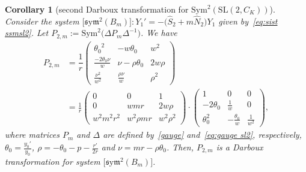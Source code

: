 \documentclass[10pt,a4paper]{amsart}
\numberwithin{equation}{section}
\newtheorem{Corollary}[Theorem]{Corollary}
\def\Sym{\mathrm{Sym}}
\def\sym{\mathfrak{s}\mathrm{y}\mathfrak{m}}
\begin{document}
\begin{Corollary}[second Darboux transformation for $\Sym^2 (\mathrm{SL}(2,C_K))$] \label{thnudarsl22} Consider the system $\big[\sym^2 (B_m)\big]\colon Y_1'=-\big(\widehat{S}_2 + m \widehat{N}_2\big) Y_1$ given by~\eqref{eq:sist ssmsl2}.
Let $P_{2,m} :=\Sym^2 \big(\Delta P_m \Delta^{-1}\big)$. We have
\begin{align}
 P_{2,m} &= \dfrac{1}{r} \begin{pmatrix} {\theta_0}^{2}&-w \theta_0&{w}^{2}
\\ \frac{-2 \theta_0 \nu }{w}&\nu- \rho \theta_0&2 w \rho
\\ \frac {\nu^{2}}{{w}^{2}}&{\frac {\rho \nu }{w}}&{\rho}^{2}\end{pmatrix}\nonumber
\\
&= \frac1{r}\begin{pmatrix}
0&0&1\\ 0&wmr&2 w\rho
\\ {w}^{2}{m}^{2}{r}^{2}&{w}^{2}\rho mr&{w}^{2}{
\rho}^{2}
\end{pmatrix}
\cdot
\begin{pmatrix}
1&0&0\\ -2 \theta_{{0}}
&\frac1{w}&0\\ \theta_{{0}}^{2}&-{\frac{\theta_{0}}{w}}& 	\frac1{w^2}
\end{pmatrix}\!,\label{eq:DT sl22}
\end{align}
where matrices $P_m$ and $\Delta$ are defined by~\eqref{gauge} and~\eqref{eq:gauge sl2}, respectively, $\theta_0= \frac{y_0'}{y_0}$, $\rho = -\theta_0- p - \frac{r'}{2r}$
and $\nu=mr - \rho \theta_0$.
Then, $P_{2,m}$ is a Darboux transformation for system $\big[\sym^2 (B_m)\big]$.
\end{Corollary}
\end{document}
